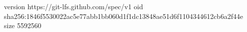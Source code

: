 version https://git-lfs.github.com/spec/v1
oid sha256:1846f5530022ac5e77abb1bb060d1f1dc13848ae51d6f1104344612cb6a2f44e
size 5592560
